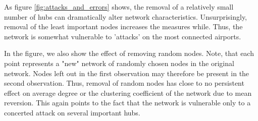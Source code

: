 As figure \ref{fig:attacks_and_errors} shows, the removal of a relatively small number of hubs can dramatically alter network characteristics. Unsurprisingly, removal of the least important nodes increases the measures while. Thus, the network is somewhat vulnerable to 'attacks' on the most connected airports.
\par
In the figure, we also show the effect of removing random nodes. Note, that each point represents a "new" network of randomly chosen nodes in the original network. Nodes left out in the first observation may therefore be present in the second observation. Thus, removal of random nodes has close to no persistent effect on average degree or the clustering coefficient of the network due to mean reversion. This again points to the fact that the network is vulnerable only to a concerted attack on several important hubs.

